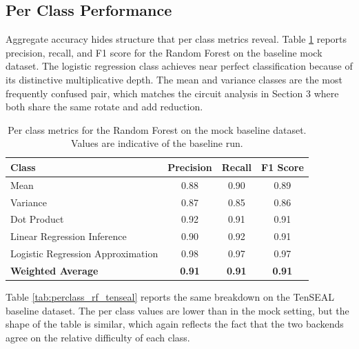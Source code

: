 \documentclass[12pt,a4paper]{article}
\begin{document}
\subsection{Per Class Performance}
Aggregate accuracy hides structure that per class metrics reveal. Table \ref{tab:perclass_rf_mock} reports precision, recall, and F1 score for the Random Forest on the baseline mock dataset. The logistic regression class achieves near perfect classification because of its distinctive multiplicative depth. The mean and variance classes are the most frequently confused pair, which matches the circuit analysis in Section 3 where both share the same rotate and add reduction.

\begin{table}[h]
\centering
\caption{Per class metrics for the Random Forest on the mock baseline dataset. Values are indicative of the baseline run.}
\label{tab:perclass_rf_mock}
\begin{tabular}{lccc}
\toprule
\textbf{Class} & \textbf{Precision} & \textbf{Recall} & \textbf{F1 Score} \\
\midrule
Mean                              & 0.88 & 0.90 & 0.89 \\
Variance                          & 0.87 & 0.85 & 0.86 \\
Dot Product                       & 0.92 & 0.91 & 0.91 \\
Linear Regression Inference       & 0.90 & 0.92 & 0.91 \\
Logistic Regression Approximation & 0.98 & 0.97 & 0.97 \\
\midrule
\textbf{Weighted Average}         & \textbf{0.91} & \textbf{0.91} & \textbf{0.91} \\
\bottomrule
\end{tabular}
\end{table}

Table \ref{tab:perclass_rf_tenseal} reports the same breakdown on the TenSEAL baseline dataset. The per class values are lower than in the mock setting, but the shape of the table is similar, which again reflects the fact that the two backends agree on the relative difficulty of each class.
\end{document}
